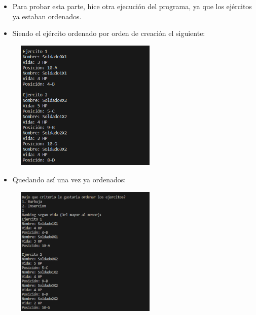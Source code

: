 \documentclass{article}
\begin{document}
	\begin{itemize}	
		\item Para probar esta parte, hice otra ejecución del programa, ya que los ejércitos ya estaban ordenados.
		\item Siendo el ejército ordenado por orden de creación el siguiente:
	\end{itemize}
	
	\begin{figure}[H]
		\centering
	\includegraphics[width=0.6\textwidth,keepaspectratio]{img/captura4.png}
	\end{figure}
	
	\begin{itemize}	
		\item Quedando así una vez ya ordenados:
		
	\end{itemize}
	
	\begin{figure}[H]
		\centering
	\includegraphics[width=0.6\textwidth,keepaspectratio]{img/captura5.png}
	\end{figure}
	
\end{document}
